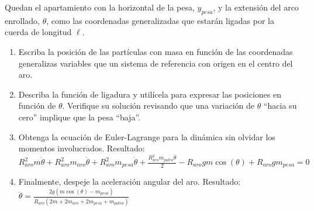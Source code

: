 \documentclass[11pt, spanish, a4paper, twoside]{article}
\begin{document}
\begin{enumerate}
\begin{minipage}[t][6cm]{0.57\textwidth}
		Quedan el apartamiento con la horizontal de la pesa, \(y_{pesa}\), y la extensión del arco enrollado, \(\theta\), como las coordenadas generalizadas que estarán ligadas por la cuerda de longitud \(\ell\).
	\end{minipage}
	\begin{minipage}[c][1.5cm][t]{0.2\textwidth}
		
	\end{minipage}
	\begin{enumerate}
		\item Escriba la posición de las partículas con masa en función de las coordenadas generalizas variables que  un sistema de referencia con origen en el centro del aro.
		\item Describa la función de ligadura y utilícela para expresar las posiciones en función de \(\theta\).
		Verifique su solución revisando que una variación de \(\theta\) ``hacia su cero'' implique que la pesa ``baja''. 
		\item Obtenga la ecuación de Euler-Lagrange para la dinámica sin olvidar los momentos involucrados. Resultado:
		\(
			R_{aro}^{2} m \ddot{\theta} + R_{aro}^{2} m_{aro} \ddot{\theta} + R_{aro}^{2} m_{pesa} \ddot{\theta} + \frac{R_{aro}^{2} m_{polea} \ddot{\theta}}{2} - R_{aro} g m \cos{\left(\theta \right)} + R_{aro} g m_{pesa} = 0
		\)
		\item Finalmente, despeje la aceleración angular del aro. Resultado:
		\(
			\ddot{\theta} = \frac{2 g \left(m \cos{\left(\theta \right)} - m_{pesa}\right)}{R_{aro} \left(2 m + 2 m_{aro} + 2 m_{pesa} + m_{polea}\right)}
		\)
	\end{enumerate}



\end{enumerate}
\end{document}
